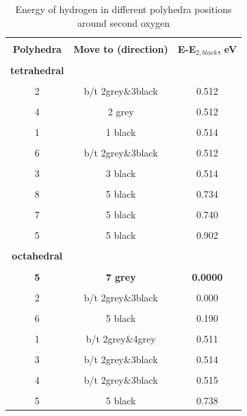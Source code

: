 \documentclass[11pt]{article}
\begin{document}
\begin{table}[H]
\scriptsize{
\caption{Energy of hydrogen in different polyhedra positions around second oxygen}
\label{energy3}
\begin{center}
\begin{tabular}{|c|c|c|}
\hline
& & \\
 \textbf{Polyhedra} & \textbf{Move to (direction)} & \textbf{E-E$_{2,black}$, eV}\\ 
\hline
& & \\
 \textbf{tetrahedral}  &  & \\ 
\hline
& & \\
2 & b/t 2grey\&3black & 0.512 \\
\hline
& & \\
4 & 2 grey & 0.512 \\
\hline
& & \\
1 & 1 black & 0.514 \\
\hline
& & \\
6 & b/t 2grey\&3black & 0.512 \\
\hline
& &\\
3 & 3 black & 0.514 \\
\hline
& & \\
8 & 5 black & 0.734 \\
\hline
& &\\
7 & 5 black & 0.740 \\
\hline
& &\\
5 & 5 black & 0.902 \\
\hline
& &\\
\textbf{octahedral} & & \\
\hline
& & \\
\textbf{5} & \textbf{7 grey} & \textbf{0.0000} \\
\hline
& &  \\
2 & b/t 2grey\&3black & 0.000 \\
\hline
& & \\
6 & 5 black & 0.190 \\
\hline
& & \\
1 & b/t 2grey\&4grey & 0.511 \\
\hline
& & \\
3 & b/t 2grey\&3black & 0.514 \\
\hline
& & \\
4 & b/t 2grey\&3black & 0.515 \\
\hline
& & \\
5 & 5 black & 0.738 \\
\hline
\end{tabular}
\end{center}
}
\end{table}
\end{document}
